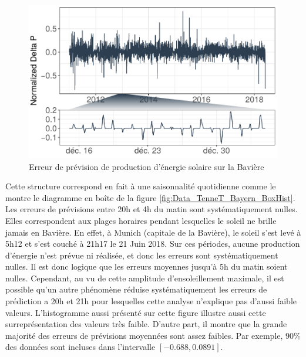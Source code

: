 \documentclass[12pt]{report}
\begin{document}
\begin{figure}	
	\begin{center}
		\includegraphics[width = 0.8 \textwidth]{Images/Data/PV/Tennet/TennetPrdErrors_WholeZoom_Mod.pdf}
		\caption{Erreur de prévision de production d'énergie solaire sur la Bavière}
		\label{fig:Data_PV_PredErrs}
	\end{center}
\end{figure}

Cette structure correspond en fait à une saisonnalité quotidienne comme le montre le diagramme en boîte de la figure \ref{fig:Data_TenneT_Bayern_BoxHist}. Les erreurs de prévisions entre 20h et 4h du matin sont systématiquement nulles. Elles correspondent aux plages horaires pendant lesquelles le soleil ne brille jamais en Bavière. En effet, à Munich (capitale de la Bavière), le soleil s'est levé à 5h12 et s'est couché à 21h17 le 21 Juin 2018. Sur ces périodes, aucune production d'énergie n'est prévue ni réalisée, et donc les erreurs sont systématiquement nulles.  Il est donc logique que les erreurs moyennes jusqu'à 5h du matin soient nulles. Cependant, au vu de cette amplitude d'ensoleillement maximale, il est possible qu'un autre phénomène réduise systématiquement les erreurs de prédiction a 20h et 21h pour lesquelles cette analyse n'explique pas d'aussi faible valeurs. L'histogramme aussi présenté sur cette figure illustre aussi cette surreprésentation des valeurs très faible. D'autre part, il montre que la grande majorité des erreurs de prévisions moyennées sont assez faibles. Par exemple, $90 \%$ des données sont incluses dans l'intervalle $[-0.688 , 0.0891]$. 
\end{document}
